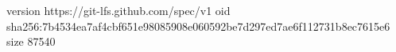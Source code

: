 version https://git-lfs.github.com/spec/v1
oid sha256:7b4534ea7af4cbf651e98085908e060592be7d297ed7ae6f112731b8ec7615e6
size 87540

